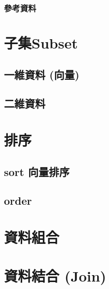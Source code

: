 \documentclass[
]{book}
\begin{document}
\hypertarget{ux53c3ux8003ux8cc7ux6599}{%
\subsubsection{參考資料}\label{ux53c3ux8003ux8cc7ux6599}}

\hypertarget{subset}{%
\section{子集Subset}\label{subset}}

\hypertarget{ux4e00ux7dadux8cc7ux6599-ux5411ux91cf}{%
\subsection{一維資料 (向量)}\label{ux4e00ux7dadux8cc7ux6599-ux5411ux91cf}}

\hypertarget{ux4e8cux7dadux8cc7ux6599}{%
\subsection{二維資料}\label{ux4e8cux7dadux8cc7ux6599}}

\hypertarget{ux6392ux5e8f}{%
\section{排序}\label{ux6392ux5e8f}}

\hypertarget{sort-ux5411ux91cfux6392ux5e8f}{%
\subsection{sort 向量排序}\label{sort-ux5411ux91cfux6392ux5e8f}}

\hypertarget{order}{%
\subsection{order}\label{order}}

\hypertarget{ux8cc7ux6599ux7d44ux5408}{%
\section{資料組合}\label{ux8cc7ux6599ux7d44ux5408}}

\hypertarget{ux8cc7ux6599ux7d50ux5408-join}{%
\section{資料結合 (Join)}\label{ux8cc7ux6599ux7d50ux5408-join}}
\end{document}
